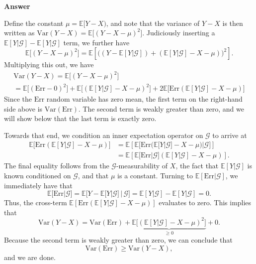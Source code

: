 \documentclass[11pt]{article}
\newcommand\E{\mathbb{E}}
\newcommand\Var{\text{Var}}
\newcommand\cG{\mathcal{G}}
\newenvironment{hwanswer}
    {
        \vspace{2mm}
        {\bfseries Answer}
        \vspace{-\abovedisplayskip}
        \begin{center}
            \begin{tcolorbox}[
                width=0.95\textwidth,
                colback=white,
                colframe=white,
                opacityback=0,
                opacityframe=0,
                boxrule=0pt,
                frame hidden,
                breakable,
                before upper={\parindent15pt} %
            ]
            \lineskip=0pt %
    }
    {
        \end{tcolorbox}
        \end{center}
        \vspace{4mm}
    }
\begin{document}
    \begin{hwanswer}
        Define the constant $\mu = \E[Y - X)$, and note that the variance of $Y - X$ is
        then written as $\Var(Y - X) = \E\big[ (Y - X - \mu)^2 \big]$. Judiciously
        inserting a $\E[Y | \cG] - \E[Y | \cG]$ term, we further have
        \[
            \E\big[ (Y - X - \mu)^2 \big]
            =
            \E\left[
                \big( (Y - \E[Y | \cG]) + (\E[Y | \cG] - X - \mu) \big)^2
            \right].
        \]
        Multiplying this out, we have
        \[
            \begin{multlined}
                \Var(Y - X)
                =
                \E\big[ (Y - X - \mu)^2 \big]
                \\
                =
                \E\big[ (\text{Err} - 0)^2 \big]
                +
                \E\big[ (\E[Y | \cG] - X - \mu)^2 \big]
                +
                2 \E\big[ \text{Err} (\E[Y | \cG] - X - \mu) \big]
            \end{multlined}
        \]
        Since the $\text{Err}$ random variable has zero mean, the first term on the
        right-hand side above is $\Var(\text{Err})$. The second term is weakly greater
        than zero, and we will show below that the last term is exactly zero.

        Towards that end, we condition an inner expectation operator on $\cG$ to arrive
        at
        \[
            \begin{aligned}
                \E\big[
                    \text{Err}(\E[Y | \cG] - X - \mu)
                \big]
                &=
                \E\left[
                    \E\big[
                        \text{Err}(\E[Y | \cG] - X - \mu)
                        |
                        \cG
                    \big]
                \right]
                \\
                &=
                \E\left[
                    \E\big[ \text{Err} | \cG \big]
                    (\E[Y | \cG] - X - \mu)
                \right].
            \end{aligned}
        \]
        The final equality follows from the $\cG$-measurability of $X$, the fact that
        $\E[Y | \cG]$ is known conditioned on $\cG$, and that $\mu$ is a constant. Turning
        to $\E[\text{Err} | \cG]$, we immediately have that
        \[
            \E\big[ \text{Err} | \cG \big]
            =
            \E\big[ Y - \E[Y | \cG] \, | \, \cG \big]
            =
            \E[Y | \cG]
            -
            \E[Y | \cG]
            = 0.
        \]
        Thus, the cross-term $\E[\text{Err}(\E[Y | \cG] - X - \mu)]$ evaluates to zero. This
        implies that
        \[
            \Var(Y - X)
            =
            \Var(\text{Err})
            +
            \underbrace{
                \E\big[ (\E[Y | \cG] - X - \mu)^2 \big]
            }_{\geq 0}
            + 0.
        \]
        Because the second term is weakly greater than zero, we can conclude that
        \[
            \Var(\text{Err}) \geq \Var(Y - X),
        \]
        and we are done.
    \end{hwanswer}
\end{document}
